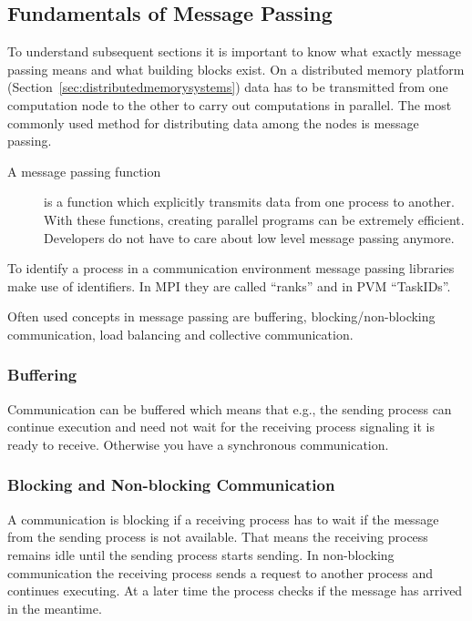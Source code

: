 \subsection{Fundamentals of Message Passing}
\label{sec:messagepassing}

To understand subsequent sections it is important to know what exactly
message passing means and what building blocks exist.
On a distributed memory platform
(Section~\ref{sec:distributedmemorysystems}) data has to be transmitted
from one computation node to the other to carry out computations in
parallel. The most commonly used method for distributing data among
the nodes is message passing.
  
\begin{description}
\item[A message passing function] is a function which explicitly transmits
  data from one process to another. With these
  functions, creating parallel programs can be extremely
  efficient. Developers do not have to care about low level
  message passing anymore.
\end{description}

To identify a process in a communication environment message passing
libraries make use of identifiers. In MPI they are called ``ranks''
and in PVM ``TaskIDs''.

Often used concepts in message passing are buffering,
blocking/non-blocking communication, load balancing and collective
communication. 

\subsubsection{Buffering}

Communication can be buffered which means that e.g., the sending
process can continue execution and need not wait for the receiving
process signaling it is ready to receive. Otherwise you have a synchronous
communication. 

\subsubsection{Blocking and Non-blocking Communication}

A communication is blocking if a receiving process has to wait if the
message from the sending process is not available. That means the
receiving process remains idle until the sending process starts
sending. In non-blocking communication the receiving process sends a
request to another process and continues executing. At a later time
the process checks if the message has arrived in the meantime. 

